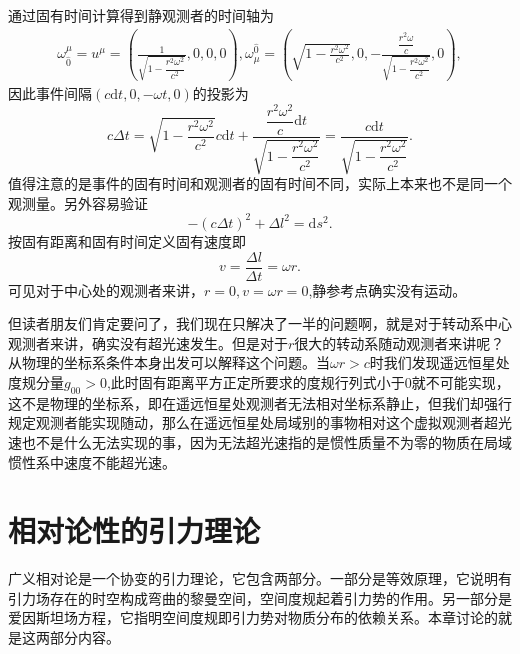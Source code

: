 \documentclass[11pt, a4paper, oneside, onecolumn]{ctexart}
\numberwithin{equation}{subsection}
\begin{document}
通过固有时间计算得到静观测者的时间轴为
\begin{align}
\omega_{\hat{0}}^{\mu}=u^{\mu}=\left(\frac{1}{\sqrt{1-\dfrac{r^{2}\omega^{2}}{c^{2}}}},0,0,0\right),\omega_{\mu}^{\hat{0}}=\left(\sqrt{1-\frac{r^{2}\omega^{2}}{c^{2}}},0,-\frac{\dfrac{r^{2}\omega}{c}}{\sqrt{1-\dfrac{r^{2}\omega^{2}}{c^{2}}}},0\right),
\end{align}
因此事件间隔$\left(c\mathrm{d}t,0,-\omega t,0\right)$的投影为
\begin{equation}
c\Delta{}t=\sqrt{1-\frac{r^{2}\omega^{2}}{c^{2}}}c\mathrm{d}t+\frac{\dfrac{r^{2}\omega^{2}}{c}\mathrm{d}t}{\sqrt{1-\dfrac{r^{2}\omega^{2}}{c^{2}}}}=\frac{c\mathrm{d}t}{\sqrt{1-\dfrac{r^{2}\omega^{2}}{c^{2}}}}.
\end{equation}
值得注意的是事件的固有时间和观测者的固有时间不同，实际上本来也不是同一个观测量。另外容易验证
\begin{equation}
-\left(c\Delta{}t\right)^{2}+\Delta{}l^{2}=\mathrm{d}s^{2}.
\end{equation}
按固有距离和固有时间定义固有速度即
\begin{equation}
v=\frac{\Delta{}l}{\Delta{}t}=\omega r.
\end{equation}
可见对于中心处的观测者来讲，$r=0,v=\omega r=0$,静参考点确实没有运动。

但读者朋友们肯定要问了，我们现在只解决了一半的问题啊，就是对于转动系中心观测者来讲，确实没有超光速发生。但是对于$r$很大的转动系随动观测者来讲呢？从物理的坐标系条件本身出发可以解释这个问题。当$\omega r>c$时我们发现遥远恒星处度规分量$g_{00}>0$,此时固有距离平方正定所要求的度规行列式小于0就不可能实现，这不是物理的坐标系，即在遥远恒星处观测者无法相对坐标系静止，但我们却强行规定观测者能实现随动，那么在遥远恒星处局域别的事物相对这个虚拟观测者超光速也不是什么无法实现的事，因为无法超光速指的是惯性质量不为零的物质在局域惯性系中速度不能超光速。

\newpage
\section{相对论性的引力理论}
广义相对论是⼀个协变的引⼒理论，它包含两部分。⼀部分是等效原理，它说明有引⼒场存在的时空构成弯曲的黎曼空间，空间度规起着引⼒势的作⽤。另⼀部分是爱因斯坦场⽅程，它指明空间度规即引⼒势对物质分布的依赖关系。本章讨论的就是这两部分内容。
\end{document}
